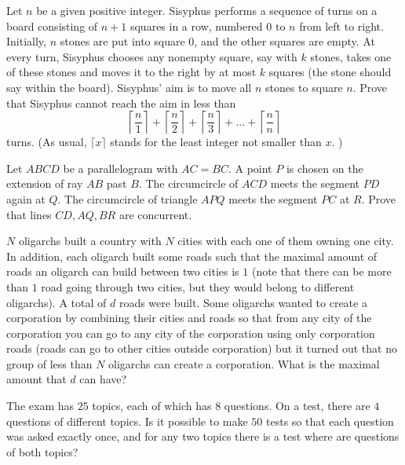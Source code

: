 \documentclass[11pt]{scrartcl}
\begin{document}
\begin{problem}[8670333331361701457]
	Let $n$ be a given positive integer. Sisyphus performs a sequence of turns on a board consisting of $n + 1$ squares in a row, numbered $0$ to $n$ from left to right. Initially, $n$ stones are put into square $0$, and the other squares are empty. At every turn, Sisyphus chooses any nonempty square, say with $k$ stones, takes one of these stones and moves it to the right by at most $k$ squares (the stone should say within the board). Sisyphus' aim is to move all $n$ stones to square $n$.
Prove that Sisyphus cannot reach the aim in less than
\[ \left \lceil \frac{n}{1} \right \rceil + \left \lceil \frac{n}{2} \right \rceil + \left \lceil \frac{n}{3} \right \rceil + \dots + \left \lceil \frac{n}{n} \right \rceil \]turns. (As usual, $\lceil x \rceil$ stands for the least integer not smaller than $x$. )
\end{problem}
\begin{problem}[682786464566571]
Let $ABCD$ be a parallelogram with $AC=BC.$ A point $P$ is chosen on the extension of ray $AB$ past $B.$ The circumcircle of $ACD$ meets the segment $PD$ again at $Q.$ The circumcircle of triangle $APQ$ meets the segment $PC$ at $R.$ Prove that lines $CD,AQ,BR$ are concurrent.
\end{problem}
\begin{problem}[4439711278400170990]
	$N$ oligarchs built a country with $N$ cities with each one of them owning one city. In addition, each oligarch built some roads such that the maximal amount of roads an oligarch can build between two cities is $1$ (note that there can be more than $1$ road going through two cities, but they would belong to different oligarchs).
A total of $d$ roads were built. Some oligarchs wanted to create a corporation by combining their cities and roads so that from any city of the corporation you can go to any city of the corporation using only corporation roads (roads can go to other cities outside corporation) but it turned out that no group of less than $N$ oligarchs can create a corporation. What is the maximal amount that $d$ can have?
\end{problem}
\begin{problem}[5101270312905584526]
The exam has $25$ topics, each of which has $8$ questions. On a test, there are $4$ questions of different topics.
Is it possible to make $50$ tests so that each question was asked exactly once, and for any two topics there is a test where are questions of both topics?
\end{problem}
\end{document}
